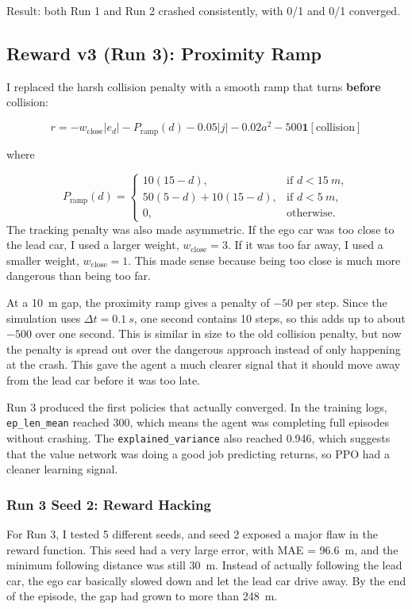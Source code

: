 \documentclass{article}
\begin{document}
Result: both Run 1 and Run 2 crashed consistently, with 0/1 and 0/1 converged.

\subsection*{Reward v3 (Run 3): Proximity Ramp}

I replaced the harsh collision penalty with a smooth ramp that turns \textbf{before} collision:

\[
r = -w_{\text{close}}|e_d| - P_{\text{ramp}}(d) - 0.05|j| - 0.02a^2 - 500\mathbf{1}[\text{collision}]
\]

where

\[
P_{\text{ramp}}(d) =
\begin{cases}
10(15 - d), & \text{if } d < \SI{15}{m}, \\
50(5 - d) + 10(15 - d), & \text{if } d < \SI{5}{m}, \\
0, & \text{otherwise.}
\end{cases}
\]
The tracking penalty was also made asymmetric. If the ego car was too close to the lead car, I used a larger weight, $w_{\text{close}} = 3$. If it was too far away, I used a smaller weight, $w_{\text{close}} = 1$. This made sense because being too close is much more dangerous than being too far.

At a \SI{10}{m} gap, the proximity ramp gives a penalty of $-50$ per step. Since the simulation uses $\Delta t = \SI{0.1}{s}$, one second contains 10 steps, so this adds up to about $-500$ over one second. This is similar in size to the old collision penalty, but now the penalty is spread out over the dangerous approach instead of only happening at the crash. This gave the agent a much clearer signal that it should move away from the lead car before it was too late.

Run 3 produced the first policies that actually converged. In the training logs, \texttt{ep\_len\_mean} reached 300, which means the agent was completing full episodes without crashing. The \texttt{explained\_variance} also reached 0.946, which suggests that the value network was doing a good job predicting returns, so PPO had a cleaner learning signal.

\subsubsection*{Run 3 Seed 2: Reward Hacking}

For Run 3, I tested 5 different seeds, and seed 2 exposed a major flaw in the reward function. This seed had a very large error, with MAE = \SI{96.6}{m}, and the minimum following distance was still \SI{30}{m}. Instead of actually following the lead car, the ego car basically slowed down and let the lead car drive away. By the end of the episode, the gap had grown to more than \SI{248}{m}.
\end{document}
